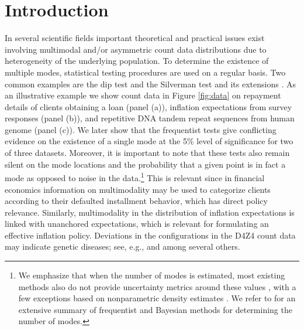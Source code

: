 \documentclass[11pt]{article}
\begin{document}
\section{Introduction}
In several scientific fields important theoretical and practical issues exist involving multimodal and/or asymmetric count data distributions due to heterogeneity of the underlying population. To determine the existence of multiple modes, statistical testing procedures are used on a regular basis.
Two common examples are the dip test \citep{Hartigan1985dip,Hartigan1985computation} and the Silverman test and its extensions \citep{silverman1981using,FischerMammenMarron_1994_CSDA}.
As an illustrative example we show count data in Figure \ref{fig:data} on repayment details of clients obtaining a loan (panel (a)), inflation expectations from survey responses (panel (b)), and repetitive DNA tandem repeat sequences from human genome (panel (c)). We later show that the 
frequentist tests give conflicting evidence on the existence of a single mode at the 5\% level of significance for two of three datasets. Moreover, it is important to note that these tests also remain silent on the mode locations and the probability that a given point is in fact a mode as opposed to noise in the data.\footnote{We emphasize that when the number of modes is estimated, most existing methods also do not provide uncertainty metrics around these values \citep{FischerMammenMarron_1994_CSDA,hall2004attributing}, with a few exceptions based on nonparametric density estimates \citep{MillerWernerSawitzki_1991_JASA,Minnote_1997_AnnStat,ChaudhuriMarron1999_JASA}. We refer to \cite{mclachlan2004finite} for an extensive summary of frequentist and Bayesian methods for determining the number of modes.} This is relevant since in financial economics information on multimodality may be used to categorize clients according to their defaulted installment behavior, which has direct policy relevance. Similarly, multimodality in the distribution of inflation expectations is linked with unanchored expectations, which is relevant for formulating an effective inflation policy. Deviations in the configurations in the D4Z4 count data may indicate genetic diseases; see, e.g., \cite{Bruceetal2009} and \cite{Balogetal2012} among several others.
\end{document}
